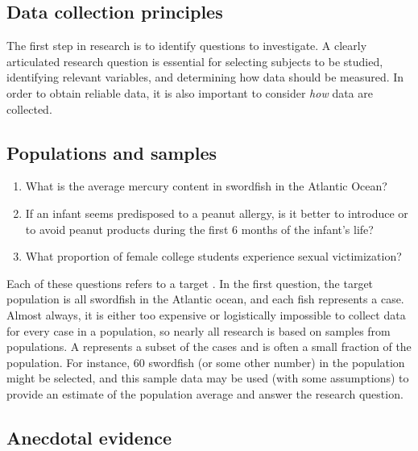 \begin{doublespace}
\section{Data collection principles}
\label{dataCollectionPrinciples}


The first step in research is to identify questions to investigate. A clearly articulated research question is essential for selecting subjects to be studied, identifying relevant variables, and determining how data should be measured. In order to obtain reliable data, it is also important to consider \textit{how} data are collected.

\subsection{Populations and samples}
\label{populationsAndSamples}

\begin{enumerate}
\setlength{\itemsep}{0mm}

\item What is the average mercury content in swordfish in the Atlantic Ocean?

\item If an infant seems predisposed to a peanut allergy, is it better to introduce or to avoid peanut products during the first 6 months of the infant's life?

\item What proportion of female college students experience sexual victimization?

\end{enumerate}

Each of these questions refers to a target . In the first question, the target population is all swordfish in the Atlantic ocean, and each fish represents a case. Almost always, it is either too expensive or logistically impossible to collect data for every case in a population, so nearly all research is based on samples from populations. A  represents a subset of the cases and is often a small fraction of the population. For instance, 60 swordfish (or some other number) in the population might be selected, and this sample data may be used (with some assumptions) to provide an estimate of the population average and answer the research question.



\subsection{Anecdotal evidence}
\label{anecdotalEvidence}


\end{doublespace}
